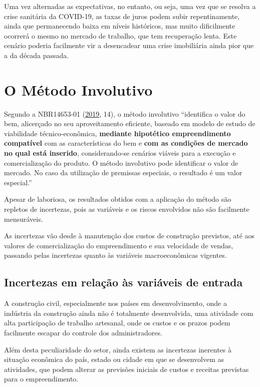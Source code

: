 \documentclass[
	12pt,				%
	oneside,			%
	a4paper,			%
	chapter=TITLE,		%
	section=TITLE,		%
	english,			%
	brazil				%
	]{abntex2}
\begin{document}
Uma vez alternadas as expectativas, no entanto, ou seja, uma vez que se resolva
a crise sanitária da COVID-19, as taxas de juros podem subir repentinamente,
ainda que permanecendo baixa em níveis históricos, mas muito dificilmente
ocorrerá o mesmo no mercado de trabalho, que tem recuperação lenta. Este cenário
poderia facilmente vir a desencadear uma crise imobiliária ainda pior que a da
década passada.

\hypertarget{involutivo}{%
\chapter{O Método Involutivo}\label{involutivo}}

Segundo a NBR14653-01 (\protect\hyperlink{ref-NBR1465301}{2019}, 14), o método involutivo ``identifica o
valor do bem, alicerçado no seu aproveitamento eficiente, baseado em modelo de
estudo de viabilidade técnico-econômica, \textbf{mediante hipotético empreendimento
compatível} com as características do bem e \textbf{com as condições de mercado no
qual está inserido}, considerando-se cenários viáveis para a execução e
comercialização do produto. O método involutivo pode identificar o valor de
mercado. No caso da utilização de premissas especiais, o resultado é um valor
especial.''

Apesar de laboriosa, os resultados obtidos com a aplicação do método são repletos
de incertezas, pois as variáveis e os riscos envolvidos não são facilmente
mensuráveis.

As incertezas vão desde à manutenção dos custos de construção previstos, até aos
valores de comercialização do empreendimento e sua velocidade de vendas,
passando pelas incertezas quanto às variáveis macroeconômicas vigentes.

\hypertarget{incertezas-em-relauxe7uxe3o-uxe0s-variuxe1veis-de-entrada}{%
\section{Incertezas em relação às variáveis de entrada}\label{incertezas-em-relauxe7uxe3o-uxe0s-variuxe1veis-de-entrada}}

A construção civil, especialmente nos países em desenvolvimento, onde a
indústria da construção ainda não é totalmente desenvolvida, uma atividade com
alta participação de trabalho artesanal, onde os custos e os prazos podem
facilmente escapar do controle dos administradores.

Além desta peculiaridade do setor, ainda existem as incertezas inerentes à
situação econômica do país, estado ou cidade em que se desenvolvem as atividades,
que podem alterar as previsões iniciais de custos e receitas previstas para o
empreendimento.
\end{document}
